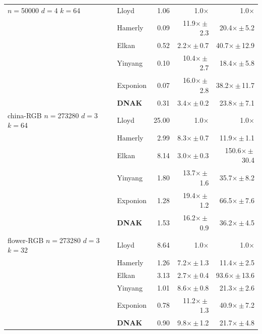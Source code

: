 \documentclass[review,12pt]{elsarticle}
\begin{document}
\begin{table}[t]
\begin{tabular}{llrrr}
\midrule
$n{=}$50000 $d{=}$4 $k{=}$64 & Lloyd & 1.06 & 1.0$\times$ & 1.0$\times$ \\
 & Hamerly & 0.09 & 11.9$\times$\,$\pm$\,2.3 & 20.4$\times$\,$\pm$\,5.2 \\
 & Elkan & 0.52 & 2.2$\times$\,$\pm$\,0.7 & 40.7$\times$\,$\pm$\,12.9 \\
 & Yinyang & 0.10 & 10.4$\times$\,$\pm$\,2.7 & 18.4$\times$\,$\pm$\,5.8 \\
 & Exponion & 0.07 & 16.0$\times$\,$\pm$\,2.8 & 38.2$\times$\,$\pm$\,11.7 \\
 & \textbf{DNAK} & 0.31 & 3.4$\times$\,$\pm$\,0.2 & 23.8$\times$\,$\pm$\,7.1 \\
\midrule
china-RGB $n{=}$273280 $d{=}$3 $k{=}$64 & Lloyd & 25.00 & 1.0$\times$ & 1.0$\times$ \\
 & Hamerly & 2.99 & 8.3$\times$\,$\pm$\,0.7 & 11.9$\times$\,$\pm$\,1.1 \\
 & Elkan & 8.14 & 3.0$\times$\,$\pm$\,0.3 & 150.6$\times$\,$\pm$\,30.4 \\
 & Yinyang & 1.80 & 13.7$\times$\,$\pm$\,1.6 & 35.7$\times$\,$\pm$\,8.2 \\
 & Exponion & 1.28 & 19.4$\times$\,$\pm$\,1.2 & 66.5$\times$\,$\pm$\,7.6 \\
 & \textbf{DNAK} & 1.53 & 16.2$\times$\,$\pm$\,0.9 & 36.2$\times$\,$\pm$\,4.5 \\
\midrule
flower-RGB $n{=}$273280 $d{=}$3 $k{=}$32 & Lloyd & 8.64 & 1.0$\times$ & 1.0$\times$ \\
 & Hamerly & 1.26 & 7.2$\times$\,$\pm$\,1.3 & 11.4$\times$\,$\pm$\,2.5 \\
 & Elkan & 3.13 & 2.7$\times$\,$\pm$\,0.4 & 93.6$\times$\,$\pm$\,13.6 \\
 & Yinyang & 1.01 & 8.6$\times$\,$\pm$\,0.8 & 21.3$\times$\,$\pm$\,2.6 \\
 & Exponion & 0.78 & 11.2$\times$\,$\pm$\,1.3 & 40.9$\times$\,$\pm$\,7.2 \\
 & \textbf{DNAK} & 0.90 & 9.8$\times$\,$\pm$\,1.2 & 21.7$\times$\,$\pm$\,4.8 \\
\bottomrule
\end{tabular}
\end{table}
\end{document}
